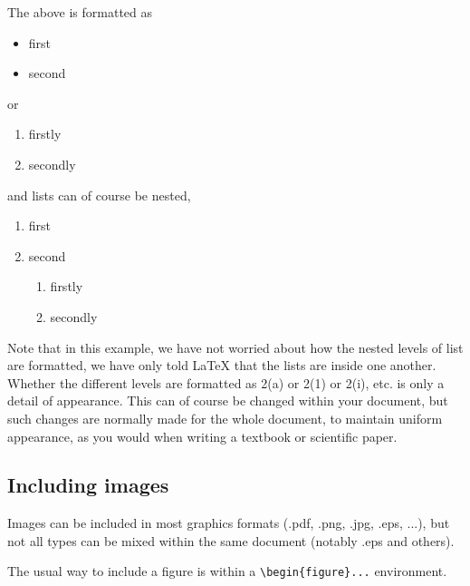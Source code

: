 \documentclass[a4paper,12pt]{article}
\begin{document}
 The above is formatted as
\begin{itemize}
 \item first
 \item second
\end{itemize}
or 
\begin{enumerate}
 \item firstly
 \item secondly
\end{enumerate}
and lists can of course be nested, 
\begin{enumerate}
 \item first
 \item second
 \begin{enumerate}
  \item firstly
  \item secondly
 \end{enumerate}
\end{enumerate}

Note that in this example, we have not worried about how the nested
levels of list are formatted, we have only told LaTeX that the lists
are inside one another.  Whether the different levels are formatted as
2(a) or 2(1) or 2(i), etc. is only a detail of appearance.  This can
of course be changed within your document, but such changes are
normally made for the whole document, to maintain uniform appearance,
as you would when writing a textbook or scientific paper.

\subsection{Including images}
Images can be included in most graphics formats (.pdf, .png, .jpg,
.eps, ...), but not all types can be mixed within the same document
(notably .eps and others).

The usual way to include a figure is within a \verb+\begin{figure}...+
environment.
\end{document}
